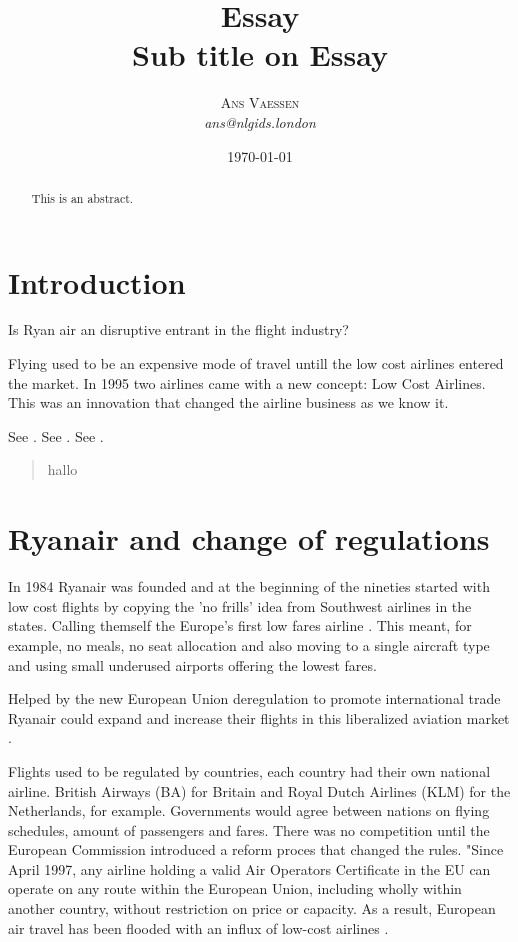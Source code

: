 \documentclass[a4paper, 11pt]{article}
\title{\textbf{Essay}\\Sub title on Essay}
\author{\textsc{Ans Vaessen}
\\{\textit{ans@nlgids.london}}}
\date{\today}
\begin{document}
\maketitle

\begin{abstract}
This is an abstract.
\end{abstract}

\vspace{30pt} %

\section*{Introduction}
Is Ryan air an disruptive entrant in the flight industry?


Flying used to be an expensive mode of travel untill the low cost airlines entered the market. In 1995 two airlines came with a new concept: Low Cost Airlines. This was an innovation that changed the airline business as we know it.




See \cite{Christensen97}.
See \citep{Christensen97}.
See \citep[p. 145]{Christensen97}.


\begin{quote}
hallo
\end{quote}

\section{Ryanair and change of regulations}

In 1984 Ryanair was founded and at the beginning of the nineties started with low cost flights by copying the 'no frills' idea from Southwest airlines in the states. Calling themself the Europe’s first low fares airline \cite{Ryanair}. This meant, for example, no meals, no seat allocation and also moving to a single aircraft type and using small underused airports \citep{Diaconu} offering the lowest fares.

Helped by the new European Union deregulation to promote international trade Ryanair could expand and increase their flights in this liberalized aviation market \citep{Dianconu}.

Flights used to be regulated by countries, each country had their own national airline. British Airways (BA) for Britain and Royal Dutch Airlines (KLM) for the Netherlands, for example. Governments would agree between nations on flying schedules, amount of passengers and fares. There was no competition until the European Commission introduced a reform proces that changed the rules. "Since April 1997, any airline holding a valid Air Operators Certificate in the EU can operate on any route within the European Union, including wholly within another country, without restriction on price or capacity. As a result, European air travel has been flooded with an influx of low-cost airlines \citep{Eurocontrol}.
\end{document}
